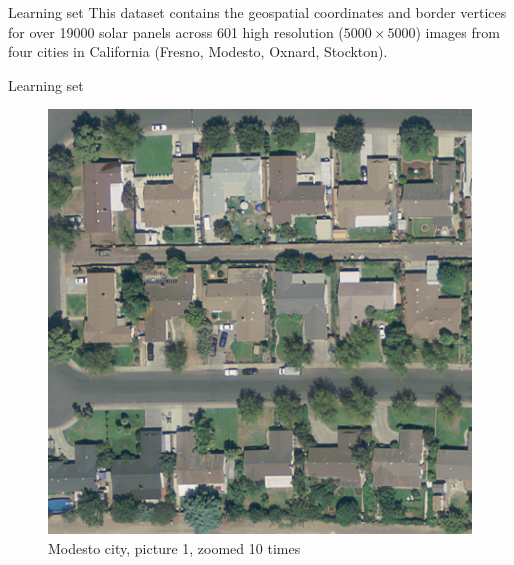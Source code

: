 \documentclass[12pt]{beamer}
\begin{document}
\begin{frame}{Learning set}
    This dataset contains the geospatial coordinates and border vertices for over \alert{\num{19000}} solar panels across \alert{\num{601}} high resolution ($5000 \times 5000$) images from four cities in California (Fresno, Modesto, Oxnard, Stockton).
\end{frame}

\begin{frame}{Learning set}
    \begin{figure}
        \centering
        \includegraphics[height=0.8\textheight]{./resources/png/modesto.png}
        \caption{Modesto city, picture 1, zoomed 10 times}
    \end{figure}
\end{frame}
\end{document}
